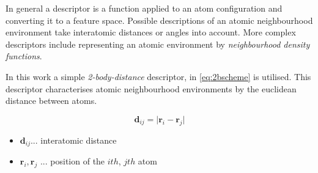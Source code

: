 In general a descriptor is a function applied to an atom configuration and converting it to a feature space. Possible descriptions of an atomic neighbourhood environment take interatomic distances or angles into account. More complex descriptors include representing an atomic environment by \textit{neighbourhood density functions}.  

In this work a simple \textit{2-body-distance} descriptor, in \ref{eq:2bscheme} is utilised. This descriptor characterises atomic neighbourhood environments by the euclidean distance between atoms. 

\begin{equation}
	\textbf{d}_{ij} = \lvert \textbf{r}_i - \textbf{r}_j \rvert 
	\label{eq:2bscheme}
\end{equation}

\begin{itemize}
  \item $\textbf{d}_{ij} $... interatomic distance
  \item $\textbf{r}_i, \textbf{r}_j$  ... position of the $ith$, $jth$ atom 
\end{itemize}